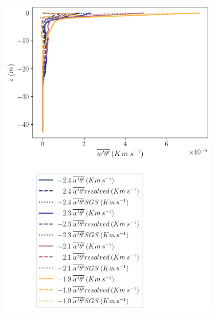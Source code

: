\begin{figure}
    \centering
    \begin{minipage}{0.5\textwidth}
        \includegraphics[trim={0 10cm 0 0},clip, width=\textwidth]{Figures/heatflux_cmp_dT_40hr_tav1_z_profile.png}
    \end{minipage}%
    \begin{minipage}{0.5\textwidth}

\end{minipage}
\end{figure}

